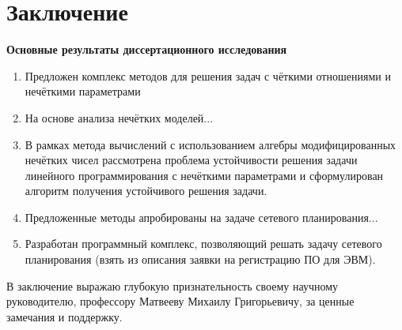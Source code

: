 \chapter*{Заключение}						%

\textbf{Основные результаты диссертационного исследования}
\begin{enumerate}
  \item Предложен комплекс методов для решения задач с чёткими отношениями и нечёткими параметрами
  \item На основе анализа нечётких моделей...
  \item В рамках метода вычислений с использованием алгебры модифицированных нечётких чисел рассмотрена проблема устойчивости решения задачи линейного программирования с нечёткими параметрами и сформулирован алгоритм получения устойчивого решения задачи.
  \item Предложенные методы апробированы на задаче сетевого планирования...
  \item Разработан программный комплекс, позволяющий решать задачу сетевого планирования (взять из описания заявки на регистрацию ПО для ЭВМ).
\end{enumerate}

В заключение выражаю глубокую признательность своему научному руководителю, профессору Матвееву Михаилу Григорьевичу, за ценные замечания и поддержку.
\clearpage